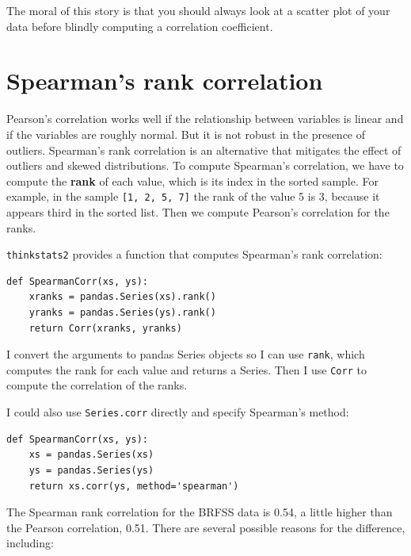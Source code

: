\documentclass[12pt]{book}
\begin{document}
The moral of this story is that you should always look at a scatter
plot of your data before blindly computing a correlation coefficient.


\section{Spearman's rank correlation}

Pearson's correlation works well if the relationship between variables
is linear and if the variables are roughly normal.  But it is not
robust in the presence of outliers.
Spearman's rank correlation is an alternative that mitigates the
effect of outliers and skewed distributions.  To compute Spearman's
correlation, we have to compute the {\bf rank} of each value, which is its
index in the sorted sample.  For example, in the sample {\tt [1, 2, 5, 7]}
the rank of the value 5 is 3, because it appears third in the sorted
list.  Then we compute Pearson's correlation for the ranks.

{\tt thinkstats2} provides a function that computes Spearman's rank
correlation:

\begin{verbatim}
def SpearmanCorr(xs, ys):
    xranks = pandas.Series(xs).rank()
    yranks = pandas.Series(ys).rank()
    return Corr(xranks, yranks)
\end{verbatim}

I convert the arguments to pandas Series objects so I can use
{\tt rank}, which computes the rank for each value and returns
a Series.  Then I use {\tt Corr} to compute the correlation
of the ranks.

I could also use {\tt Series.corr} directly and specify
Spearman's method:

\begin{verbatim}
def SpearmanCorr(xs, ys):
    xs = pandas.Series(xs)
    ys = pandas.Series(ys)
    return xs.corr(ys, method='spearman')
\end{verbatim}

The Spearman rank correlation for the BRFSS data is 0.54, a little
higher than the Pearson correlation, 0.51.  There are several possible
reasons for the difference, including:
\end{document}
